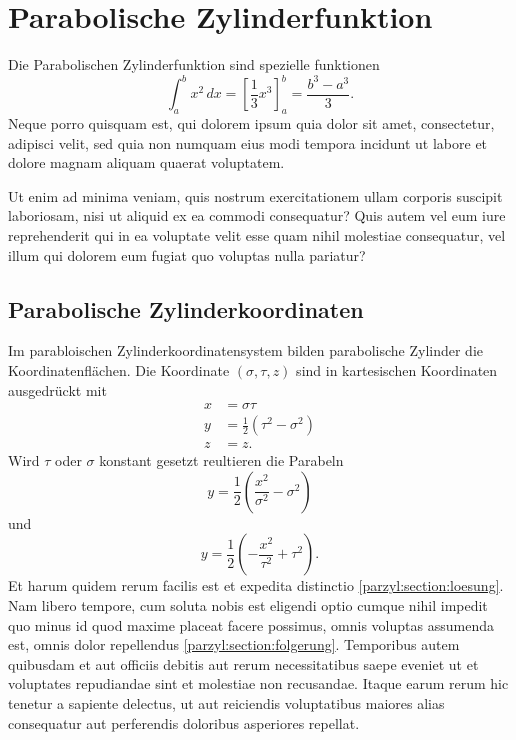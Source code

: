 %
%
%
\section{Parabolische Zylinderfunktion
\label{parzyl:section:teil1}}
Die Parabolischen Zylinderfunktion sind spezielle funktionen  
\begin{equation}
\int_a^b x^2\, dx
=
\left[ \frac13 x^3 \right]_a^b
=
\frac{b^3-a^3}3.
\label{parzyl:equation1}
\end{equation}
Neque porro quisquam est, qui dolorem ipsum quia dolor sit amet,
consectetur, adipisci velit, sed quia non numquam eius modi tempora
incidunt ut labore et dolore magnam aliquam quaerat voluptatem.

Ut enim ad minima veniam, quis nostrum exercitationem ullam corporis
suscipit laboriosam, nisi ut aliquid ex ea commodi consequatur?
Quis autem vel eum iure reprehenderit qui in ea voluptate velit
esse quam nihil molestiae consequatur, vel illum qui dolorem eum
fugiat quo voluptas nulla pariatur?

\subsection{Parabolische Zylinderkoordinaten
\label{parzyl:subsection:finibus}}
Im parabloischen Zylinderkoordinatensystem bilden parabolische Zylinder die Koordinatenflächen.
Die Koordinate $(\sigma, \tau, z)$ sind in kartesischen Koordinaten ausgedrückt mit
\begin{align}
    x & = \sigma \tau \\
    y & = \frac{1}{2}\left(\tau^2 - \sigma^2\right) \\
    z & = z.
\end{align}
Wird $\tau$ oder $\sigma$ konstant gesetzt reultieren die Parabeln
\begin{equation}
    y = \frac{1}{2} \left( \frac{x^2}{\sigma^2} - \sigma^2 \right)
\end{equation}
und 
\begin{equation}
    y = \frac{1}{2} \left( -\frac{x^2}{\tau^2} + \tau^2 \right).
\end{equation}
Et harum quidem rerum facilis est et expedita distinctio
\ref{parzyl:section:loesung}.
Nam libero tempore, cum soluta nobis est eligendi optio cumque nihil
impedit quo minus id quod maxime placeat facere possimus, omnis
voluptas assumenda est, omnis dolor repellendus
\ref{parzyl:section:folgerung}.
Temporibus autem quibusdam et aut officiis debitis aut rerum
necessitatibus saepe eveniet ut et voluptates repudiandae sint et
molestiae non recusandae.
Itaque earum rerum hic tenetur a sapiente delectus, ut aut reiciendis
voluptatibus maiores alias consequatur aut perferendis doloribus
asperiores repellat.


